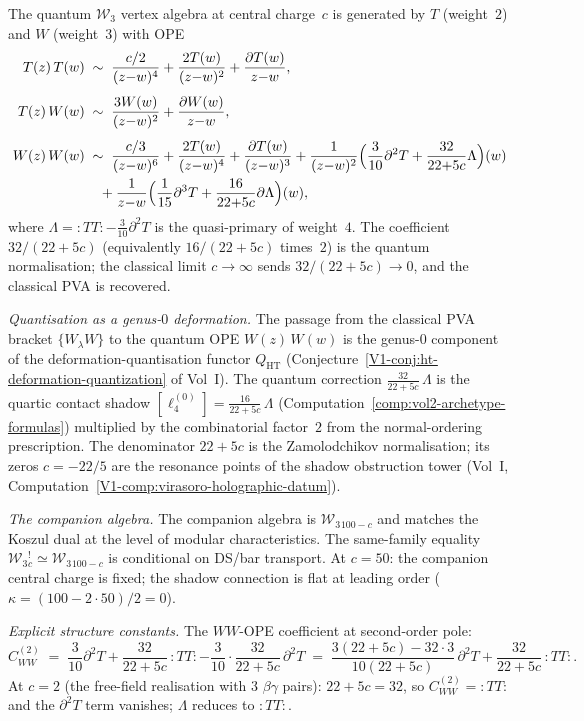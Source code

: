 \begin{computation}
The quantum $\mathcal W_3$ vertex algebra at central charge~$c$
is generated by $T$ (weight~$2$) and $W$ (weight~$3$) with OPE
\begin{align*}
T(z)\,T(w)
&\;\sim\;
\frac{c/2}{(z{-}w)^4}
+\frac{2T(w)}{(z{-}w)^2}
+\frac{\partial T(w)}{z{-}w},\\[4pt]
T(z)\,W(w)
&\;\sim\;
\frac{3W(w)}{(z{-}w)^2}
+\frac{\partial W(w)}{z{-}w},\\[4pt]
W(z)\,W(w)
&\;\sim\;
\frac{c/3}{(z{-}w)^6}
+\frac{2T(w)}{(z{-}w)^4}
+\frac{\partial T(w)}{(z{-}w)^3}
+\frac{1}{(z{-}w)^2}
\Bigl(
\frac{3}{10}\partial^2 T
+\frac{32}{22{+}5c}\Lambda
\Bigr)(w)\\
&\quad
+\frac{1}{z{-}w}
\Bigl(
\frac{1}{15}\partial^3 T
+\frac{16}{22{+}5c}\partial\Lambda
\Bigr)(w),
\end{align*}
where $\Lambda={:}TT{:}-\frac{3}{10}\partial^2 T$ is the
quasi-primary of weight~$4$. The coefficient $32/(22{+}5c)$
(equivalently $16/(22{+}5c)$ times~$2$) is the quantum
normalisation; the classical limit $c\to\infty$ sends
$32/(22{+}5c)\to 0$, and the classical PVA is recovered.

\emph{Quantisation as a genus-$0$ deformation.}
The passage from the classical PVA bracket
$\{W_\lambda W\}$ to the quantum OPE $W(z)\,W(w)$ is the
genus-$0$ component of the deformation-quantisation functor
$Q_{\mathrm{HT}}$
(Conjecture~\ref*{V1-conj:ht-deformation-quantization} of Vol~I).
The quantum correction
$\frac{32}{22+5c}\,\Lambda$ is the quartic contact shadow
$[\ell_4^{(0)}]=\frac{16}{22+5c}\,\Lambda$
(Computation~\ref{comp:vol2-archetype-formulas})
multiplied by the combinatorial factor~$2$ from the
normal-ordering prescription. The denominator $22+5c$ is
the Zamolodchikov normalisation; its zeros
$c=-22/5$ are the resonance points of the shadow obstruction tower
(Vol~I,
Computation~\ref*{V1-comp:virasoro-holographic-datum}).

\emph{The companion algebra.}
The companion algebra is $\mathcal W_3{}_{100-c}$ and matches
the Koszul dual at the level of modular characteristics. The
same-family equality
$\mathcal W_3{}_c^!\simeq\mathcal W_3{}_{100-c}$ is conditional on
DS/bar transport.
At $c=50$: the companion central charge is fixed;
the shadow connection is flat at leading order
($\kappa=(100-2\cdot 50)/2=0$).

\emph{Explicit structure constants.}
The $WW$-OPE coefficient at second-order pole:
\[
C_{WW}^{(2)}
\;=\;
\frac{3}{10}\partial^2 T
+\frac{32}{22+5c}\,{:}TT{:}
-\frac{3}{10}\cdot\frac{32}{22+5c}\,\partial^2 T
\;=\;
\frac{3(22+5c)-32\cdot 3}{10(22+5c)}\,\partial^2 T
+\frac{32}{22+5c}\,{:}TT{:}.
\]
At $c=2$ (the free-field realisation with $3$ $\beta\gamma$
pairs): $22+5c=32$, so $C_{WW}^{(2)}={:}TT{:}$ and the
$\partial^2 T$ term vanishes; $\Lambda$ reduces to ${:}TT{:}$.
\end{computation}

